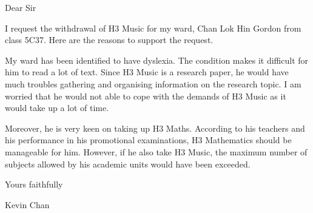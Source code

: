 \documentclass[12pt,a4paper]{letter}
\begin{document}
\thispagestyle{empty}
Dear Sir\par
I request the withdrawal of H3 Music for my ward, Chan Lok Hin Gordon from class 5C37. Here are the reasons to support the request.\par
My ward has been identified to have dyslexia. The condition makes it difficult for him to read a lot of text. Since H3 Music is a research paper, he would have much troubles gathering and organising information on the research topic. I am worried that he would not able to cope with the demands of H3 Music as it would take up a lot of time. \par
Moreover, he is very keen on taking up H3 Maths. According to his teachers and his performance in his promotional examinations, H3 Mathematics should be manageable for him. However, if he also take H3 Music, the maximum number of subjects allowed by his academic units would have been exceeded.\par
Yours faithfully\par
\quad\par
Kevin Chan
\end{document}
